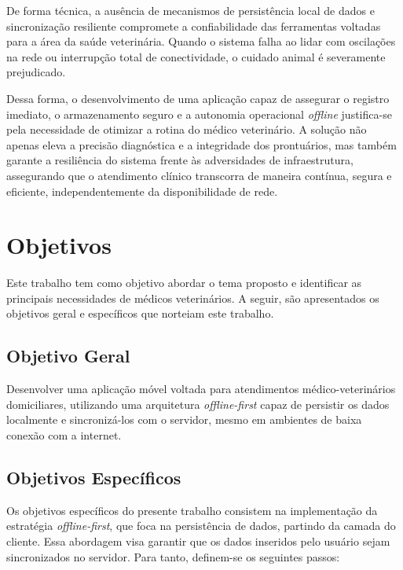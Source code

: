 De forma técnica, a ausência de mecanismos de persistência local de dados e sincronização resiliente compromete a confiabilidade das ferramentas voltadas para a área da saúde veterinária. Quando o sistema falha ao lidar com oscilações na rede ou interrupção total de conectividade, o cuidado animal é severamente prejudicado.

Dessa forma, o desenvolvimento de uma aplicação capaz de assegurar o registro imediato, o armazenamento seguro e a autonomia operacional \textit{offline} justifica-se pela necessidade de otimizar a rotina do médico veterinário. A solução não apenas eleva a precisão diagnóstica e a integridade dos prontuários, mas também garante a resiliência do sistema frente às adversidades de infraestrutura, assegurando que o atendimento clínico transcorra de maneira contínua, segura e eficiente, independentemente da disponibilidade de rede.

\section{Objetivos}
\label{sec:objetivos}

Este trabalho tem como objetivo abordar o tema proposto e identificar as principais necessidades de médicos veterinários. A seguir, são apresentados os objetivos geral e específicos que norteiam este trabalho.

\subsection{Objetivo Geral}
\label{sec:objetivo-geral}

Desenvolver uma aplicação móvel voltada para atendimentos médico-veterinários domiciliares, utilizando uma arquitetura \textit{offline-first} capaz de persistir os dados localmente e sincronizá-los com o servidor, mesmo em ambientes de baixa conexão com a internet.

\subsection{Objetivos Específicos}
\enlargethispage{2\baselineskip}
\label{sec:objetivos-especificos}

Os objetivos específicos do presente trabalho consistem na implementação da estratégia \textit{offline-first}, que foca na persistência de dados, partindo da camada do cliente. Essa abordagem visa garantir que os dados inseridos pelo usuário sejam sincronizados no servidor. Para tanto, definem-se os seguintes passos: 

